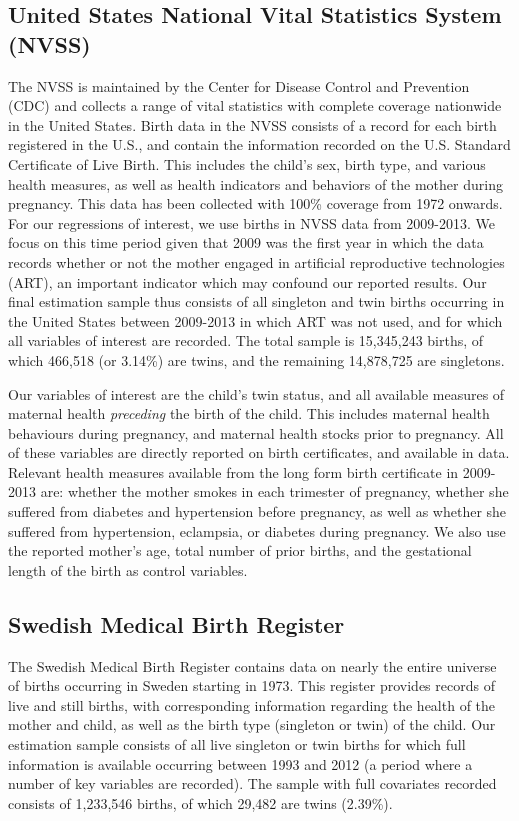 \documentclass{nature}
\begin{document}
\begin{linenumbers}
\subsection{United States National Vital Statistics System (NVSS)}
The NVSS is maintained by the Center for Disease Control and Prevention (CDC) and collects a range of vital statistics with complete coverage nationwide in the United States. Birth data in the NVSS consists of a record for each birth registered in the U.S., and contain the information recorded on the U.S. Standard Certificate of Live Birth.  This includes the child's sex, birth type, and various health measures, as well as health indicators and behaviors of the mother during pregnancy.  This data has been collected with 100\% coverage from 1972 onwards.  For our regressions of interest, we use births in NVSS data from 2009-2013\cite{Martinetal2013}.  We focus on this time period given that 2009 was the first year in which the data records whether or not the mother engaged in artificial reproductive technologies (ART), an important indicator which may confound our reported results.  Our final estimation sample thus consists of all singleton and twin births occurring in the United States between 2009-2013 in which ART was not used, and for which all variables of interest are recorded.  The total sample is 15,345,243 births, of which 466,518 (or 3.14\%) are twins, and the remaining 14,878,725 are singletons.

Our variables of interest are the child's twin status, and all available measures of maternal health \emph{preceding} the birth of the child.  This includes maternal health behaviours during pregnancy, and maternal health stocks prior to pregnancy.  All of these variables are directly reported on birth certificates, and available in data.  Relevant health measures available from the long form birth certificate in 2009-2013 are: whether the mother smokes in each trimester of pregnancy, whether she suffered from diabetes and hypertension before pregnancy, as well as whether she suffered from hypertension, eclampsia, or diabetes during pregnancy.  We also use the reported mother's age, total number of prior births, and the gestational length of the birth as control variables\cite{Hall2003,Hoekstraetal2008}.

\subsection{Swedish Medical Birth Register}
The Swedish Medical Birth Register contains data on nearly the entire universe of births occurring in Sweden starting in 1973.  This register provides records of live and still births, with corresponding information regarding the health of the mother and child, as well as the birth type (singleton or twin) of the child.  Our estimation sample consists of all live singleton or twin  births for which full information is available occurring between 1993 and 2012 (a period where a number of key variables are recorded).  The sample with full covariates recorded consists of 1,233,546 births, of which 29,482 are twins (2.39\%). 


\end{linenumbers}
\end{document}
